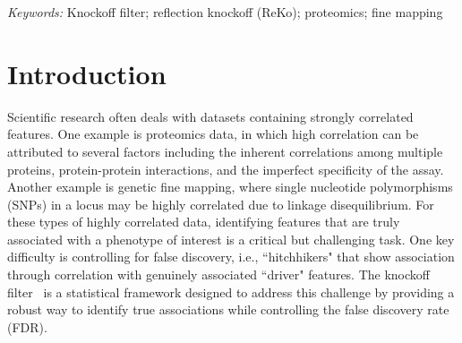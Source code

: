 \documentclass[12pt,Times]{article}
\def\cite{\citep}
\begin{document}
\vspace{0.3in}
\noindent%
{\it Keywords:}  Knockoff filter;  reflection knockoff (ReKo); proteomics; fine mapping
\vfill



\maketitle
\section{Introduction}

Scientific research often deals with datasets containing strongly correlated features. One example is proteomics data, in which high correlation can be attributed to several factors including the inherent correlations among multiple proteins, protein-protein interactions, and the imperfect specificity of the assay. Another example is genetic fine mapping, where single nucleotide polymorphisms (SNPs) in a locus may be highly correlated due to linkage disequilibrium.  For these types of highly correlated data, identifying features that are truly associated with a phenotype of interest is a critical but challenging task. One key difficulty is controlling for false discovery, i.e., ``hitchhikers" that show association through correlation with genuinely associated ``driver" features. The knockoff filter~\cite{barber.candes.15,candes.etal.18} is a statistical framework designed to address this challenge by providing a robust way to identify true associations while controlling the false discovery rate (FDR).  
\end{document}

